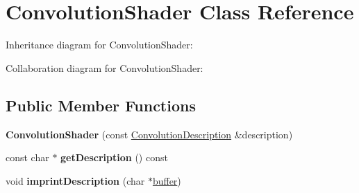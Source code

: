 \hypertarget{class_convolution_shader}{\section{Convolution\+Shader Class Reference}
\label{class_convolution_shader}
}


Inheritance diagram for Convolution\+Shader\+:


Collaboration diagram for Convolution\+Shader\+:
\subsection*{Public Member Functions}
\begin{DoxyCompactItemize}
\item 
\hypertarget{class_convolution_shader_ad88e41b7efc24ee89ccab628c0673d0f}{{\bfseries Convolution\+Shader} (const \hyperlink{struct_convolution_description}{Convolution\+Description} \&description)}\label{class_convolution_shader_ad88e41b7efc24ee89ccab628c0673d0f}

\item 
\hypertarget{class_convolution_shader_a7246778f0f1afbf83f81e5290f64daaa}{const char $\ast$ {\bfseries get\+Description} () const }\label{class_convolution_shader_a7246778f0f1afbf83f81e5290f64daaa}

\item 
\hypertarget{class_convolution_shader_ad6b7487e0ddbe62fa508be88440525d4}{void {\bfseries imprint\+Description} (char $\ast$\hyperlink{structbuffer}{buffer})}\label{class_convolution_shader_ad6b7487e0ddbe62fa508be88440525d4}

\end{DoxyCompactItemize}
